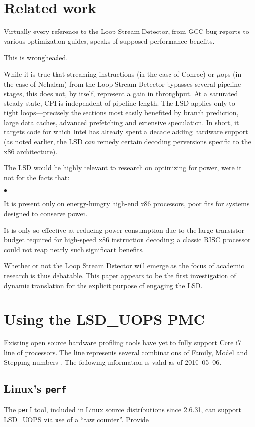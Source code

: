 \documentclass[]{sigplanconf}
\newcommand{\squishlist}{\begin{list}{$\bullet$}
  {\setlength{\itemsep}{0pt}
    \setlength{\parsep}{3pt}
    \setlength{\topsep}{3pt}
    \setlength{\partopsep}{0pt}
    \setlength{\leftmargin}{1.5em}
    \setlength{\labelwidth}{1em}
    \setlength{\labelsep}{0.5em}}}
\newcommand{\squishend}{\end{list}}
\begin{document}
\section{Related work}
Virtually every reference to the Loop Stream Detector, from GCC bug reports
\cite{gcclsd} to various optimization guides, speaks of supposed performance benefits.

This is wrongheaded.

While it is true that streaming instructions (in the case of Conroe) or $\mu$ops
(in the case of Nehalem) from the Loop Stream Detector bypasses several pipeline stages,
this does not, by itself, represent a gain in throughput. At a saturated steady
state, CPI is independent of pipeline length. The LSD applies only to tight
loops---precisely the sections most easily benefited by branch prediction,
large data caches, advanced prefetching and extensive speculation. In short,
it targets code for which Intel has already spent a decade adding hardware
support (as noted earlier, the LSD \textit{can} remedy certain decoding
perversions specific to the x86 architecture).

The LSD would be highly relevant to research on optimizing for power, were it
not for the facts that:
\squishlist
\item It is present only on energy-hungry high-end x86 processors, poor fits for
systems designed to conserve power.
\item It is only so effective at reducing power consumption due to the large
transistor budget required for high-speed x86 instruction decoding; a classic
RISC processor could not reap nearly such significant benefits.
\squishend
Whether or not the Loop Stream Detector will emerge as the focus of academic
research is thus debatable. This paper appears to be the first investigation
of dynamic translation for the explicit purpose of engaging the LSD.
\appendix
\section{Using the LSD\_UOPS PMC}

Existing open source hardware profiling tools have yet to fully support Core\texttrademark
i7 line of processors. The line represents several combinations of Family,
Model and Stepping numbers \cite{intelcpuid}. The following information is valid
as of 2010--05--06.
\subsection{Linux's \texttt{perf}}
The \texttt{perf} tool, included in Linux source distributions since 2.6.31,
can support LSD\_UOPS via use of a ``raw counter''. Provide
\end{document}
